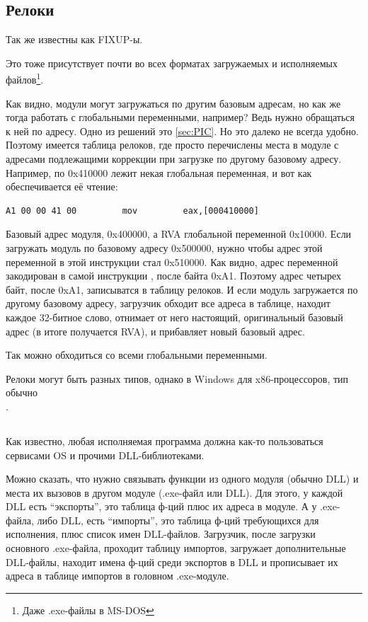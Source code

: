 \subsection{Релоки}

Так же известны как FIXUP-ы.

Это тоже присутствует почти во всех форматах загружаемых и исполняемых файлов\footnote{Даже .exe-файлы в MS-DOS}.

Как видно, модули могут загружаться по другим базовым адресам, но как же тогда работать с глобальными переменными,
например? Ведь нужно обращаться к ней по адресу. Одно из решений это \PICcode\ref{sec:PIC}. 
Но это далеко не всегда удобно.
Поэтому имеется таблица релоков, где просто перечислены места в модуле с адресами подлежащими коррекции при загрузке
по другому базовому адресу.
Например, по 0x410000 лежит некая глобальная переменная, и вот как обеспечивается её чтение:

\begin{lstlisting}
A1 00 00 41 00         mov         eax,[000410000]
\end{lstlisting}

Базовый адрес модуля, 0x400000, а \ac{RVA} глобальной переменной 0x10000. Если загружать модуль по базовому адресу
0x500000, нужно чтобы адрес этой переменной в этой инструкции стал 0x510000. Как видно, адрес переменной закодирован
в самой инструкции , после байта 0xA1. Поэтому адрес четырех байт, после 0xA1, записыватся в таблицу релоков.
И если модуль загружается по другому базовому адресу, загрузчик обходит все адреса в таблице, находит каждое 32-битное
слово, отнимает от него настоящий, оригинальный базовый адрес (в итоге получается \ac{RVA}), и прибавляет новый базовый адрес.

Так можно обходиться со всеми глобальными переменными.

Релоки могут быть разных типов, однако в Windows для x86-процессоров, тип обычно \\
.

\subsection{}

Как известно, любая исполняемая программа должна как-то пользоваться сервисами \ac{OS} и прочими DLL-библиотеками.

Можно сказать, что нужно связывать функции из одного модуля (обычно DLL) и места их вызовов в 
другом модуле (.exe-файл или DLL). 
Для этого, у каждой DLL есть ``экспорты'', это таблица ф-ций плюс их адреса в модуле.
А у .exe-файла, либо DLL, есть ``импорты'', это таблица ф-ций требующихся для исполнения, плюс список имен DLL-файлов.
Загрузчик, после загрузки основного .exe-файла, проходит таблицу импортов, загружает дополнительные DLL-файлы, 
находит имена ф-ций среди экспортов в DLL и прописывает их адреса в таблице импортов в головном .exe-модуле.

